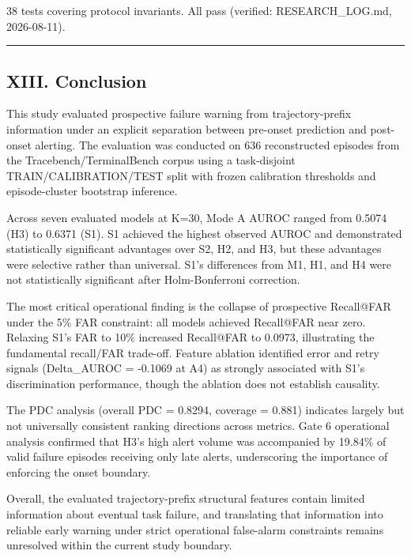 \documentclass[
]{article}
\begin{document}
38 tests covering protocol invariants. All pass (verified:
RESEARCH\_LOG.md, 2026-08-11).

\begin{center}\rule{0.5\linewidth}{0.5pt}\end{center}

\subsection{XIII. Conclusion}\label{xiii.-conclusion}

This study evaluated prospective failure warning from trajectory-prefix
information under an explicit separation between pre-onset prediction
and post-onset alerting. The evaluation was conducted on 636
reconstructed episodes from the Tracebench/TerminalBench corpus using a
task-disjoint TRAIN/CALIBRATION/TEST split with frozen calibration
thresholds and episode-cluster bootstrap inference.

Across seven evaluated models at K=30, Mode A AUROC ranged from 0.5074
(H3) to 0.6371 (S1). S1 achieved the highest observed AUROC and
demonstrated statistically significant advantages over S2, H2, and H3,
but these advantages were selective rather than universal. S1's
differences from M1, H1, and H4 were not statistically significant after
Holm-Bonferroni correction.

The most critical operational finding is the collapse of prospective
Recall@FAR under the 5\% FAR constraint: all models achieved Recall@FAR
near zero. Relaxing S1's FAR to 10\% increased Recall@FAR to 0.0973,
illustrating the fundamental recall/FAR trade-off. Feature ablation
identified error and retry signals (Delta\_AUROC = -0.1069 at A4) as
strongly associated with S1's discrimination performance, though the
ablation does not establish causality.

The PDC analysis (overall PDC = 0.8294, coverage = 0.881) indicates
largely but not universally consistent ranking directions across
metrics. Gate 6 operational analysis confirmed that H3's high alert
volume was accompanied by 19.84\% of valid failure episodes receiving
only late alerts, underscoring the importance of enforcing the onset
boundary.

Overall, the evaluated trajectory-prefix structural features contain
limited information about eventual task failure, and translating that
information into reliable early warning under strict operational
false-alarm constraints remains unresolved within the current study
boundary.
\end{document}
